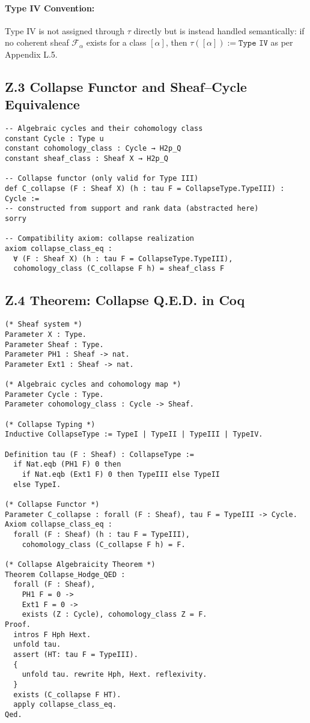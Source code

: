 \documentclass[11pt]{article}
\begin{document}
\paragraph{Type IV Convention:} Type IV is not assigned through $\tau$ directly but is instead handled semantically: if no coherent sheaf $\mathcal{F}_\alpha$ exists for a class $[\alpha]$, then $\tau([\alpha]) := \texttt{Type IV}$ as per Appendix L.5.

\subsection*{Z.3 Collapse Functor and Sheaf–Cycle Equivalence}

\begin{lstlisting}[language=Lean, caption={Collapse Functor Definition in Lean}]
-- Algebraic cycles and their cohomology class
constant Cycle : Type u
constant cohomology_class : Cycle → H2p_Q
constant sheaf_class : Sheaf X → H2p_Q

-- Collapse functor (only valid for Type III)
def C_collapse (F : Sheaf X) (h : tau F = CollapseType.TypeIII) : Cycle :=
-- constructed from support and rank data (abstracted here)
sorry

-- Compatibility axiom: collapse realization
axiom collapse_class_eq :
  ∀ (F : Sheaf X) (h : tau F = CollapseType.TypeIII),
  cohomology_class (C_collapse F h) = sheaf_class F
\end{lstlisting}

\subsection*{Z.4 Theorem: Collapse Q.E.D. in Coq}

\begin{lstlisting}[language=Coq, caption={Collapse Algebraicity Theorem in Coq}]
(* Sheaf system *)
Parameter X : Type.
Parameter Sheaf : Type.
Parameter PH1 : Sheaf -> nat.
Parameter Ext1 : Sheaf -> nat.

(* Algebraic cycles and cohomology map *)
Parameter Cycle : Type.
Parameter cohomology_class : Cycle -> Sheaf.

(* Collapse Typing *)
Inductive CollapseType := TypeI | TypeII | TypeIII | TypeIV.

Definition tau (F : Sheaf) : CollapseType :=
  if Nat.eqb (PH1 F) 0 then
    if Nat.eqb (Ext1 F) 0 then TypeIII else TypeII
  else TypeI.

(* Collapse Functor *)
Parameter C_collapse : forall (F : Sheaf), tau F = TypeIII -> Cycle.
Axiom collapse_class_eq :
  forall (F : Sheaf) (h : tau F = TypeIII),
    cohomology_class (C_collapse F h) = F.

(* Collapse Algebraicity Theorem *)
Theorem Collapse_Hodge_QED :
  forall (F : Sheaf),
    PH1 F = 0 ->
    Ext1 F = 0 ->
    exists (Z : Cycle), cohomology_class Z = F.
Proof.
  intros F Hph Hext.
  unfold tau.
  assert (HT: tau F = TypeIII).
  {
    unfold tau. rewrite Hph, Hext. reflexivity.
  }
  exists (C_collapse F HT).
  apply collapse_class_eq.
Qed.
\end{lstlisting}
\end{document}
